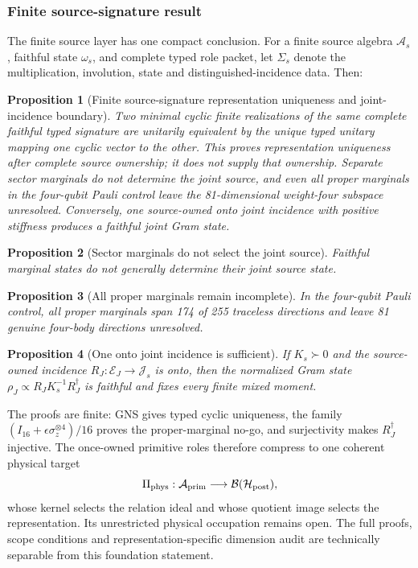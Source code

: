 \documentclass[11pt]{article}
\newtheorem{proposition}{Proposition}
\begin{document}
\subsubsection{Finite source-signature result}

The finite source layer has one compact conclusion.  For a finite source
algebra \(\mathcal A_s\), faithful state \(\omega_s\), and complete typed role
packet, let \(\Sigma_s\) denote the multiplication, involution, state and
distinguished-incidence data.  Then:
\begin{proposition}[Finite source-signature representation uniqueness and joint-incidence boundary]
\label{prop:finite-source-signature-uniqueness}
Two minimal cyclic finite realizations of the same complete faithful typed
signature are unitarily equivalent by the unique typed unitary mapping one
cyclic vector to the other.  This proves representation uniqueness after
complete source ownership; it does not supply that ownership.  Separate
sector marginals do not determine the joint source, and even all proper
marginals in the four-qubit Pauli control leave the 81-dimensional weight-four
subspace unresolved.  Conversely, one source-owned onto joint incidence with
positive stiffness produces a faithful joint Gram state.
\end{proposition}
\begin{proposition}[Sector marginals do not select the joint source]
\label{prop:marginal-joint-nogo}
Faithful marginal states do not generally determine their joint source state.
\end{proposition}
\begin{proposition}[All proper marginals remain incomplete]
\label{prop:proper-marginal-nogo}
In the four-qubit Pauli control, all proper marginals span 174 of 255 traceless
directions and leave 81 genuine four-body directions unresolved.
\end{proposition}
\begin{proposition}[One onto joint incidence is sufficient]
\label{prop:onto-joint-incidence}
If \(K_s\succ0\) and the source-owned incidence
\(R_J:\mathcal E_J\to\mathcal J_s\) is onto, then the normalized Gram state
\(\rho_J\propto R_JK_s^{-1}R_J^\dagger\) is faithful and fixes every finite
mixed moment.
\end{proposition}
The proofs are finite: GNS gives typed cyclic uniqueness, the family
\((I_{16}+\epsilon\sigma_z^{\otimes4})/16\) proves the proper-marginal no-go,
and surjectivity makes \(R_J^\dagger\) injective.  The once-owned primitive
roles therefore compress to one coherent physical target
\begin{equation}
 \Pi_{\rm phys}:\mathcal A_{\rm prim}
 \longrightarrow\mathcal B(\mathcal H_{\rm post}),
 \label{eq:physical-source-homomorphism}
\end{equation}
whose kernel selects the relation ideal and whose quotient image selects the
representation.  Its unrestricted physical occupation remains open.  The full proofs,
scope conditions and representation-specific dimension audit are technically
separable from this foundation statement.
\end{document}
